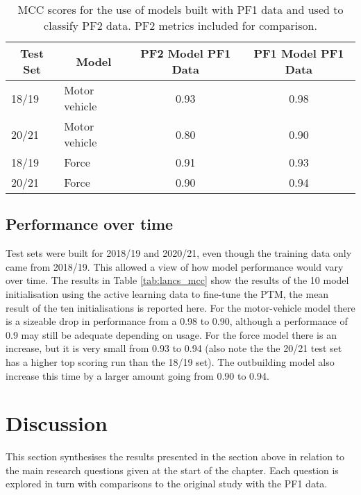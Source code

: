 \begin{table}[]
\begin{tabular}{@{}llcc@{}}
\toprule
\multicolumn{1}{c}{Test Set} & \multicolumn{1}{c}{Model} & PF2 Model PF1 Data & PF1 Model PF1 Data \\ \midrule
18/19                        & Motor vehicle             & 0.93                   & 0.98                   \\
20/21                        & Motor vehicle             & 0.80                   & 0.90                   \\
18/19                        & Force                     & 0.91  & 0.93  \\
20/21                        & Force                     & 0.90  & 0.94 \\ \bottomrule
\end{tabular}
\caption[Model metrics. Models tested on alternate police force.]{\label{tab:results_transfer} MCC scores for the use of models built with PF1 data and used to classify PF2 data. PF2 metrics included for comparison. }
\end{table}

\subsection{Performance over time} Test sets were built for 2018/19 and 2020/21, even though the training data only came from 2018/19. This allowed a view of how model performance would vary over time. The results in Table \ref{tab:lancs_mcc} show the results of the 10 model initialisation using the active learning data to fine-tune the PTM, the mean result of the ten initialisations is reported here. For the motor-vehicle model there is a sizeable drop in performance from a 0.98 to 0.90, although a performance of 0.9 may still be adequate depending on usage.  For the force model there is an increase, but it is very small from 0.93 to 0.94 (also note the the 20/21 test set has a higher top scoring run than the 18/19 set). The outbuilding model also increase this time by a larger amount going from 0.90 to 0.94.


\section{Discussion} This section synthesises the results presented in the section above in relation to the main research questions given at the start of the chapter. Each question is explored in turn with comparisons to the original study with the PF1 data.

